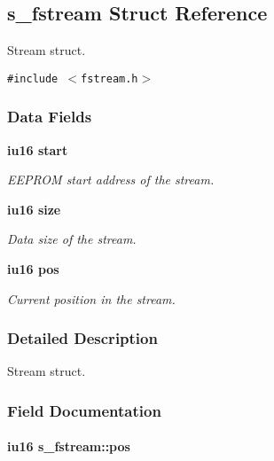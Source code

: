 \subsection{s\_\-fstream Struct Reference}
\label{structs__fstream}
Stream struct.  


{\tt \#include $<$fstream.h$>$}

\subsubsection*{Data Fields}
\begin{CompactItemize}
\item 
\bf{iu16} \bf{start}
\begin{CompactList}\small\item\em EEPROM start address of the stream. \item\end{CompactList}\item 
\bf{iu16} \bf{size}
\begin{CompactList}\small\item\em Data size of the stream. \item\end{CompactList}\item 
\bf{iu16} \bf{pos}
\begin{CompactList}\small\item\em Current position in the stream. \item\end{CompactList}\end{CompactItemize}


\subsubsection{Detailed Description}
Stream struct. 



\subsubsection{Field Documentation}
\paragraph{\setlength{\rightskip}{0pt plus 5cm}\bf{iu16} \bf{s\_\-fstream::pos}}\hfill\label{structs__fstream_40b2594138d6556befc29a2c75d254cf}


